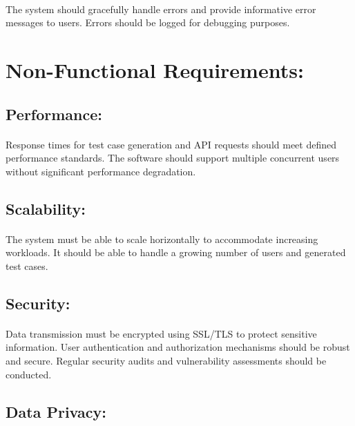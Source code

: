 \documentclass{article}
\begin{document}
\paragraph{}
The system should gracefully handle errors and provide informative error messages to users.
Errors should be logged for debugging purposes.


\section{Non-Functional Requirements:}
\subsection{Performance:}
\paragraph{}
Response times for test case generation and API requests should meet defined performance
standards. The software should support multiple concurrent users without significant
performance degradation.

\subsection{Scalability:}
\paragraph{}
The system must be able to scale horizontally to accommodate increasing workloads.
It should be able to handle a growing number of users and generated test cases.

\subsection{Security:}
\paragraph{}
Data transmission must be encrypted using SSL/TLS to protect sensitive information.
User authentication and authorization mechanisms should be robust and secure.
Regular security audits and vulnerability assessments should be conducted.

\subsection{Data Privacy:}
\end{document}
